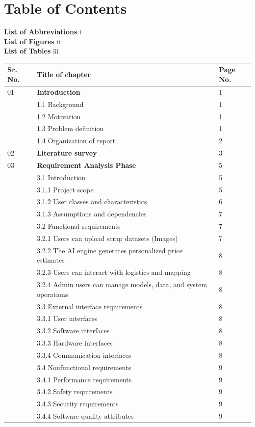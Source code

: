 \newpage

\clearpage
\chapter*{Table of Contents}  %
\thispagestyle{empty}

\noindent
\textbf{List of Abbreviations} \hfill i\\
\textbf{List of Figures} \hfill ii\\
\textbf{List of Tables} \hfill iii

\begin{longtable}{|p{1cm}|p{12cm}|p{1.5cm}|}
\hline
\textbf{Sr. No.} & \textbf{Title of chapter} & \textbf{Page No.}\\
\hline
01 & \textbf{Introduction} & 1\\
   & 1.1 Background & 1\\
   & 1.2 Motivation & 1\\
   & 1.3 Problem definition & 1\\
   & 1.4 Organization of report & 2\\
\hline
02 & \textbf{Literature survey} & 3\\
\hline
03 & \textbf{Requirement Analysis Phase} & 5\\
   & 3.1 Introduction & 5\\
   & 3.1.1 Project scope & 5\\
   & 3.1.2 User classes and characteristics & 6\\
   & 3.1.3 Assumptions and dependencies & 7\\
   & 3.2  Functional requirements & 7\\
   & 3.2.1  Users can upload scrap datasets (Images)& 7\\
   & 3.2.2  The AI engine generates personalized price estimates& 8\\
   & 3.2.3 Users can interact with logistics and mapping & 8\\
   & 3.2.4 Admin users can manage models, data, and system operations & 8\\
   & 3.3 External interface requirements & 8\\
   & 3.3.1 User interfaces & 8\\
   & 3.3.2 Software interfaces & 8\\
   & 3.3.3 Hardware interfaces & 8\\
   & 3.3.4 Communication interfaces & 8\\
   & 3.4 Nonfunctional requirements & 9\\
   & 3.4.1 Performance requirements & 9\\
   & 3.4.2 Safety requirements & 9\\
   & 3.4.3 Security requirements & 9\\ 
   & 3.4.4 Software quality attributes & 9\\
\hline
   

\end{longtable}
